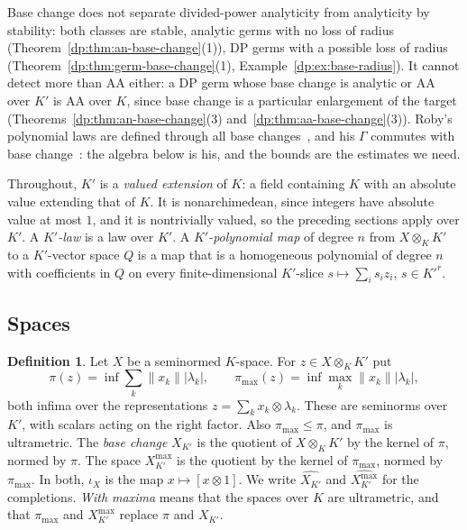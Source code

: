 \documentclass[11pt]{amsart}
\theoremstyle{definition}
\newtheorem{definition}[theorem]{Definition}
\theoremstyle{remark}
\numberwithin{equation}{section}
\newcommand{\abs}[1]{\lvert #1\rvert}
\newcommand{\norm}[1]{\lVert #1\rVert}
\theoremstyle{plain}
\theoremstyle{definition}
\theoremstyle{plain}
\begin{document}
Base change does not separate divided-power analyticity from analyticity by stability: both classes are stable, analytic germs with no loss of radius (Theorem~\ref{dp:thm:an-base-change}(1)), DP germs with a possible loss of radius (Theorem~\ref{dp:thm:germ-base-change}(1), Example~\ref{dp:ex:base-radius}). It cannot detect more than AA either: a DP germ whose base change is analytic or AA over $K'$ is AA over $K$, since base change is a particular enlargement of the target (Theorems~\ref{dp:thm:an-base-change}(3) and~\ref{dp:thm:aa-base-change}(3)). Roby's polynomial laws are defined through all base changes~\cite[pp.~219--220]{Ro}, and his $\Gamma$ commutes with base change~\cite[Th.~III.3]{Ro}: the algebra below is his, and the bounds are the estimates we need.

Throughout, $K'$ is a \emph{valued extension} of $K$: a field containing $K$ with an absolute value extending that of $K$. It is nonarchimedean, since integers have absolute value at most $1$, and it is nontrivially valued, so the preceding sections apply over $K'$. A \emph{$K'$-law} is a law over $K'$. A \emph{$K'$-polynomial map} of degree $n$ from $X\otimes_KK'$ to a $K'$-vector space $Q$ is a map that is a homogeneous polynomial of degree $n$ with coefficients in $Q$ on every finite-dimensional $K'$-slice $s\mapsto\sum_is_iz_i$, $s\in K'^r$.

\subsection{Spaces}

\begin{definition}\label{dp:def:base-change}
Let $X$ be a seminormed $K$-space. For $z\in X\otimes_KK'$ put
\[
 \pi(z)=\inf\sum_k\norm{x_k}\abs{\lambda_k},\qquad\pi_{\max}(z)=\inf\max_k\norm{x_k}\abs{\lambda_k},
\]
both infima over the representations $z=\sum_kx_k\otimes\lambda_k$. These are seminorms over $K'$, with scalars acting on the right factor. Also $\pi_{\max}\le\pi$, and $\pi_{\max}$ is ultrametric. The \emph{base change} $X_{K'}$ is the quotient of $X\otimes_KK'$ by the kernel of $\pi$, normed by $\pi$. The space $X^{\max}_{K'}$ is the quotient by the kernel of $\pi_{\max}$, normed by $\pi_{\max}$. In both, $\iota_X$ is the map $x\mapsto[x\otimes1]$. We write $\widehat{X_{K'}}$ and $\widehat{X^{\max}_{K'}}$ for the completions. \emph{With maxima} means that the spaces over $K$ are ultrametric, and that $\pi_{\max}$ and $X^{\max}_{K'}$ replace $\pi$ and $X_{K'}$.
\end{definition}
\end{document}
